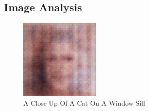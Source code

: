 \documentclass{article}%
\begin{document}
%
\subsection{Image Analysis}%
\label{subsec:ImageAnalysis}%


\begin{figure}[h!]%
\centering%
\includegraphics[width=150px]{500_fake_images/samples_5_137.png}%
\caption{A Close Up Of A Cat On A Window Sill}%
\end{figure}

%
\end{document}
